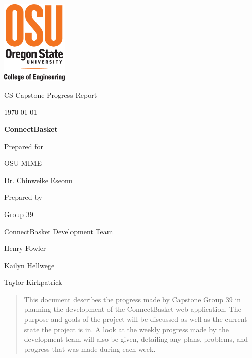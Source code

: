 \documentclass[onecolumn, draftclsnofoot,10pt, compsoc]{IEEEtran}
\def \CapstoneTeamName{		ConnectBasket Development Team}
\def \CapstoneTeamNumber{		39}
\def \GroupMemberOne{			Henry Fowler}
\def \GroupMemberTwo{			Kailyn Hellwege}
\def \GroupMemberThree{			Taylor Kirkpatrick}
\def \CapstoneProjectName{		ConnectBasket}
\def \CapstoneSponsorCompany{	OSU MIME}
\def \CapstoneSponsorPerson{		Dr. Chinweike Eseonu}
\def \DocType{		%
				Progress Report
				}
\newcommand{\NameSigPair}[1]{\par
\makebox[2.75in][r]{#1} \hfil 	\makebox[3.25in]{\makebox[2.25in]{\hrulefill} \hfill		\makebox[.75in]{\hrulefill}}
\par\vspace{-12pt} \textit{\tiny\noindent
\makebox[2.75in]{} \hfil		\makebox[3.25in]{\makebox[2.25in][r]{Signature} \hfill	\makebox[.75in][r]{Date}}}}
\renewcommand{\NameSigPair}[1]{#1}
\begin{document}
\begin{titlepage}
    \begin{singlespace}
    	\includegraphics[height=4cm]{coe_v_spot1}
        \hfill 
        \par\vspace{.2in}
        \centering
        \scshape{
            \huge CS Capstone \DocType \par
            {\large\today}\par
            \vspace{.5in}
            \textbf{\Huge\CapstoneProjectName}\par
            \vfill
            {\large Prepared for}\par
            \Huge \CapstoneSponsorCompany\par
            \vspace{5pt}
            {\Large\NameSigPair{\CapstoneSponsorPerson}\par}
            {\large Prepared by }\par
            Group\CapstoneTeamNumber\par
            \CapstoneTeamName\par 
            \vspace{5pt}
            {\Large
                \NameSigPair{\GroupMemberOne}\par
                \NameSigPair{\GroupMemberTwo}\par
                \NameSigPair{\GroupMemberThree}\par
            }
            \vspace{20pt}
        }
        \begin{abstract}
        This document describes the progress made by Capstone Group 39 in planning the development of the ConnectBasket web application. The purpose and goals of the project will be discussed as well as the current state the project is in. A look at the weekly progress made by the development team will also be given, detailing any plans, problems, and progress that was made during each week.

        \end{abstract}     
    \end{singlespace}
\end{titlepage}
\newpage
{}
\tableofcontents
\clearpage
\end{document}
